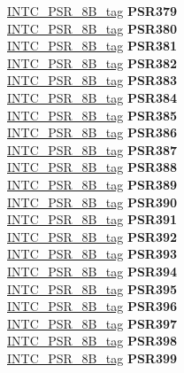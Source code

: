 \begin{DoxyCompactItemize}
\begin{tabbing}
\>\>\mbox{\hyperlink{unionINTC__PSR__8B__tag}{INTC\_PSR\_8B\_tag}} {\bfseries PSR379}\\
\>\>\mbox{\hyperlink{unionINTC__PSR__8B__tag}{INTC\_PSR\_8B\_tag}} {\bfseries PSR380}\\
\>\>\mbox{\hyperlink{unionINTC__PSR__8B__tag}{INTC\_PSR\_8B\_tag}} {\bfseries PSR381}\\
\>\>\mbox{\hyperlink{unionINTC__PSR__8B__tag}{INTC\_PSR\_8B\_tag}} {\bfseries PSR382}\\
\>\>\mbox{\hyperlink{unionINTC__PSR__8B__tag}{INTC\_PSR\_8B\_tag}} {\bfseries PSR383}\\
\>\>\mbox{\hyperlink{unionINTC__PSR__8B__tag}{INTC\_PSR\_8B\_tag}} {\bfseries PSR384}\\
\>\>\mbox{\hyperlink{unionINTC__PSR__8B__tag}{INTC\_PSR\_8B\_tag}} {\bfseries PSR385}\\
\>\>\mbox{\hyperlink{unionINTC__PSR__8B__tag}{INTC\_PSR\_8B\_tag}} {\bfseries PSR386}\\
\>\>\mbox{\hyperlink{unionINTC__PSR__8B__tag}{INTC\_PSR\_8B\_tag}} {\bfseries PSR387}\\
\>\>\mbox{\hyperlink{unionINTC__PSR__8B__tag}{INTC\_PSR\_8B\_tag}} {\bfseries PSR388}\\
\>\>\mbox{\hyperlink{unionINTC__PSR__8B__tag}{INTC\_PSR\_8B\_tag}} {\bfseries PSR389}\\
\>\>\mbox{\hyperlink{unionINTC__PSR__8B__tag}{INTC\_PSR\_8B\_tag}} {\bfseries PSR390}\\
\>\>\mbox{\hyperlink{unionINTC__PSR__8B__tag}{INTC\_PSR\_8B\_tag}} {\bfseries PSR391}\\
\>\>\mbox{\hyperlink{unionINTC__PSR__8B__tag}{INTC\_PSR\_8B\_tag}} {\bfseries PSR392}\\
\>\>\mbox{\hyperlink{unionINTC__PSR__8B__tag}{INTC\_PSR\_8B\_tag}} {\bfseries PSR393}\\
\>\>\mbox{\hyperlink{unionINTC__PSR__8B__tag}{INTC\_PSR\_8B\_tag}} {\bfseries PSR394}\\
\>\>\mbox{\hyperlink{unionINTC__PSR__8B__tag}{INTC\_PSR\_8B\_tag}} {\bfseries PSR395}\\
\>\>\mbox{\hyperlink{unionINTC__PSR__8B__tag}{INTC\_PSR\_8B\_tag}} {\bfseries PSR396}\\
\>\>\mbox{\hyperlink{unionINTC__PSR__8B__tag}{INTC\_PSR\_8B\_tag}} {\bfseries PSR397}\\
\>\>\mbox{\hyperlink{unionINTC__PSR__8B__tag}{INTC\_PSR\_8B\_tag}} {\bfseries PSR398}\\
\>\>\mbox{\hyperlink{unionINTC__PSR__8B__tag}{INTC\_PSR\_8B\_tag}} {\bfseries PSR399}\\

\end{tabbing}
\end{DoxyCompactItemize}
